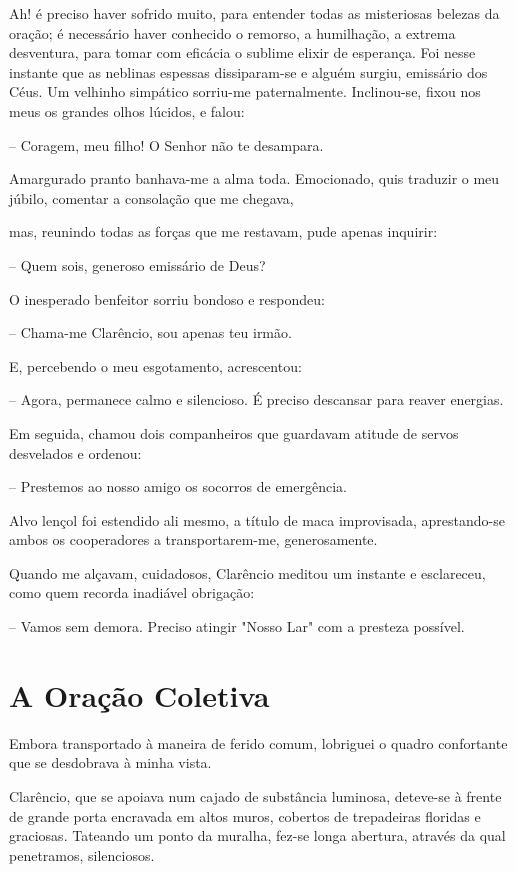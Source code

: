 \documentclass[portuguese,12pt,a4paper]{scrbook}
\begin{document}
	Ah! é preciso haver sofrido muito, para entender todas as misteriosas belezas da oração; é necessário haver conhecido o remorso, a humilhação, a extrema desventura, para tomar com eficácia o sublime elixir de esperança. Foi nesse instante que as neblinas espessas dissiparam-se e alguém surgiu, emissário dos Céus. Um velhinho simpático sorriu-me paternalmente. Inclinou-se, fixou nos meus os grandes olhos lúcidos, e falou:
	
	– Coragem, meu filho! O Senhor não te desampara.
	
	Amargurado pranto banhava-me a alma toda. Emocionado, quis traduzir o meu júbilo, comentar a consolação que me chegava,
	
	
	mas, reunindo todas as forças que me restavam, pude apenas inquirir:
	
	– Quem sois, generoso emissário de Deus?
	
	O inesperado benfeitor sorriu bondoso e respondeu:
	
	– Chama-me Clarêncio, sou apenas teu irmão.
	
	E, percebendo o meu esgotamento, acrescentou:
	
	– Agora, permanece calmo e silencioso. É preciso descansar para reaver energias.
	
	Em seguida, chamou dois companheiros que guardavam atitude de servos desvelados e ordenou:
	
	– Prestemos ao nosso amigo os socorros de emergência.
	
	Alvo lençol foi estendido ali mesmo, a título de maca improvisada, aprestando-se ambos os cooperadores a transportarem-me, generosamente.
	
	Quando me alçavam, cuidadosos, Clarêncio meditou um instante e esclareceu, como quem recorda inadiável obrigação:
	
	– Vamos sem demora. Preciso atingir "Nosso Lar" com a presteza possível.
	
	
	\chapter{A Oração Coletiva}
	
	Embora transportado à maneira de ferido comum, lobriguei o quadro confortante que se desdobrava à minha vista.
	
	Clarêncio, que se apoiava num cajado de substância luminosa, deteve-se à frente de grande porta encravada em altos muros, cobertos de trepadeiras floridas e graciosas. Tateando um ponto da muralha, fez-se longa abertura, através da qual penetramos, silenciosos.
	
\end{document}

